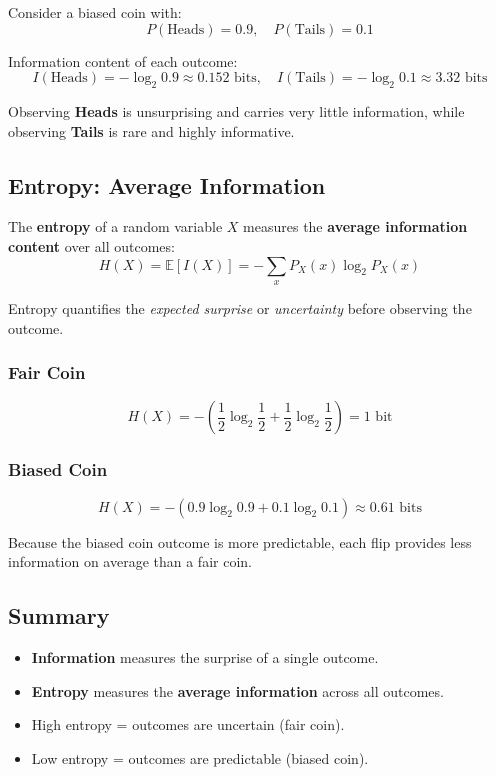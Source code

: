\documentclass[11pt]{article}
\begin{document}
Consider a biased coin with:
\[
P(\text{Heads}) = 0.9, \quad P(\text{Tails}) = 0.1
\]

Information content of each outcome:
\[
I(\text{Heads}) = - \log_2 0.9 \approx 0.152 \text{ bits}, \quad
I(\text{Tails}) = - \log_2 0.1 \approx 3.32 \text{ bits}
\]

Observing \textbf{Heads} is unsurprising and carries very little information, while observing \textbf{Tails} is rare and highly informative.

\subsection*{Entropy: Average Information}

The \textbf{entropy} of a random variable $X$ measures the \textbf{average information content} over all outcomes:
\[
H(X) = \mathbb{E}[I(X)] = - \sum_x P_X(x) \log_2 P_X(x)
\]

Entropy quantifies the \emph{expected surprise} or \emph{uncertainty} before observing the outcome.

\subsubsection*{Fair Coin}

\[
H(X) = - \left( \frac{1}{2} \log_2 \frac{1}{2} + \frac{1}{2} \log_2 \frac{1}{2} \right) = 1 \text{ bit}
\]

\subsubsection*{Biased Coin}

\[
H(X) = - \left(0.9 \log_2 0.9 + 0.1 \log_2 0.1 \right) \approx 0.61 \text{ bits}
\]

Because the biased coin outcome is more predictable, each flip provides less information on average than a fair coin.

\subsection*{Summary}

\begin{itemize}
    \item \textbf{Information} measures the surprise of a single outcome.  
    \item \textbf{Entropy} measures the \textbf{average information} across all outcomes.  
    \item High entropy = outcomes are uncertain (fair coin).  
    \item Low entropy = outcomes are predictable (biased coin).  
\end{itemize}
\end{document}
